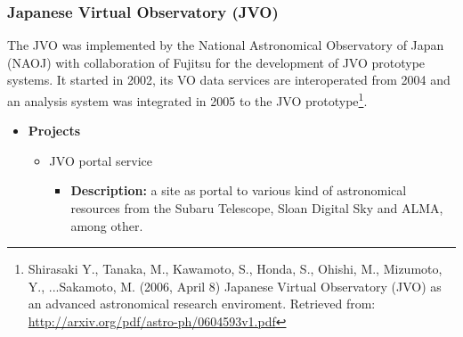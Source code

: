 \begin{comment}
\item \textbf{Description:}
\end{itemize}
\item VO Tools Worlwide
\begin{itemize}
\item \textbf{Description:}
\end{itemize}
\item LAMOST Online Collaboration Platform
\begin{itemize}
\item \textbf{Description:}
\end{itemize}
\item Chinese Astronomical Data Center 
\begin{itemize}
\item \textbf{Description:}
\end{itemize}
\item WWT Community Beijing
\begin{itemize}
\item \textbf{Description:}
\end{itemize}
\item Glossary of Astronomical Terms
\begin{itemize}
\item \textbf{Description:}
\end{itemize}
\end{itemize}
\end{itemize}
\end{comment}

\subsubsection{Japanese Virtual Observatory (JVO)}
The JVO \cite{website:jvo-home} was implemented by the National Astronomical
Observatory of Japan (NAOJ) with collaboration of Fujitsu for the development of
JVO prototype systems. It started in 2002, its VO data services are
interoperated from 2004 and an analysis system was integrated in 2005 to the JVO
prototype\footnote{Shirasaki Y., Tanaka, M., Kawamoto, S., Honda, S., Ohishi,
M., Mizumoto, Y., ...Sakamoto, M. (2006, April 8) Japanese Virtual Observatory
(JVO) as an advanced astronomical research enviroment. Retrieved from:
\url{http://arxiv.org/pdf/astro-ph/0604593v1.pdf}}.

\begin{itemize}
\item \textbf{Projects}
\begin{itemize}
\item JVO portal service
\begin{itemize}
\item \textbf{Description:} a site as portal to various kind of astronomical
resources from the Subaru Telescope, Sloan Digital Sky and ALMA, among other.
\end{itemize}
\end{itemize}
\end{itemize}

